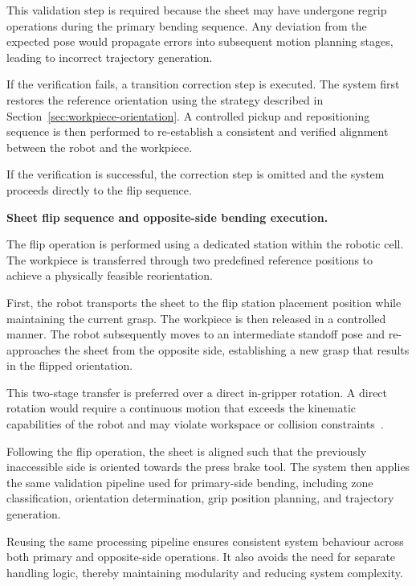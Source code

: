 This validation step is required because the sheet may have undergone regrip operations during the primary bending sequence. Any deviation from the expected pose would propagate errors into subsequent motion planning stages, leading to incorrect trajectory generation.

If the verification fails, a transition correction step is executed. The system first restores the reference orientation using the strategy described in Section~\ref{sec:workpiece-orientation}. A controlled pickup and repositioning sequence is then performed to re-establish a consistent and verified alignment between the robot and the workpiece.

If the verification is successful, the correction step is omitted and the system proceeds directly to the flip sequence.

\label{sec:sheet-flip-opposite-side-bending-execution}
\noindent\textbf{Sheet flip sequence and opposite-side bending execution.}

The flip operation is performed using a dedicated station within the robotic cell. The workpiece is transferred through two predefined reference positions to achieve a physically feasible reorientation.

First, the robot transports the sheet to the flip station placement position while maintaining the current grasp. The workpiece is then released in a controlled manner. The robot subsequently moves to an intermediate standoff pose and re-approaches the sheet from the opposite side, establishing a new grasp that results in the flipped orientation.

This two-stage transfer is preferred over a direct in-gripper rotation. A direct rotation would require a continuous motion that exceeds the kinematic capabilities of the robot and may violate workspace or collision constraints~\cite{lynch2017modern}.

Following the flip operation, the sheet is aligned such that the previously inaccessible side is oriented towards the press brake tool. The system then applies the same validation pipeline used for primary-side bending, including zone classification, orientation determination, grip position planning, and trajectory generation.

Reusing the same processing pipeline ensures consistent system behaviour across both primary and opposite-side operations. It also avoids the need for separate handling logic, thereby maintaining modularity and reducing system complexity.

